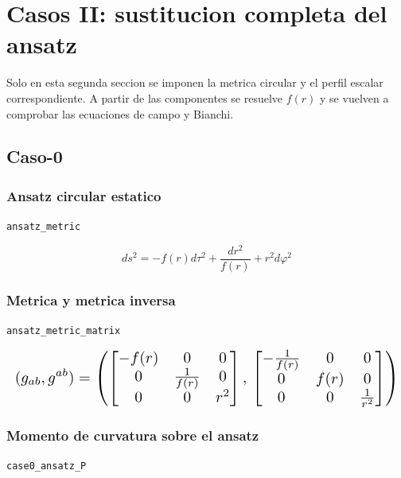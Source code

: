 \documentclass[11pt,a4paper]{article}
\begin{document}
\section{Casos II: sustitucion completa del ansatz}

Solo en esta segunda seccion se imponen la metrica circular y el perfil escalar correspondiente. A partir de las componentes se resuelve $f(r)$ y se vuelven a comprobar las ecuaciones de campo y Bianchi.

\subsection{Caso-0}

\subsubsection{Ansatz circular estatico}

\noindent\texttt{ansatz\_metric}\par\nopagebreak[4]

\[
ds^2 = -f(r)d\tau^2+\frac{dr^2}{f(r)}+r^2d\varphi^2
\]

\subsubsection{Metrica y metrica inversa}

\noindent\texttt{ansatz\_metric\_matrix}\par\nopagebreak[4]

\[
\resizebox{\textwidth}{!}{$\displaystyle (g_{ab},g^{ab}) = \left(\left[\begin{matrix}- f{\left(r \right)} & 0 & 0\\0 & \frac{1}{f{\left(r \right)}} & 0\\0 & 0 & r^{2}\end{matrix}\right],\,\left[\begin{matrix}- \frac{1}{f{\left(r \right)}} & 0 & 0\\0 & f{\left(r \right)} & 0\\0 & 0 & \frac{1}{r^{2}}\end{matrix}\right]\right)$}
\]

\subsubsection{Momento de curvatura sobre el ansatz}

\noindent\texttt{case0\_ansatz\_P}\par\nopagebreak[4]
\end{document}

